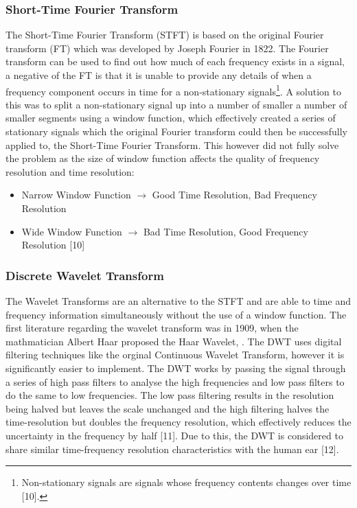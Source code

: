 \documentclass[a4paper, 11pt]{article}
\begin{document}
\subsubsection{Short-Time Fourier Transform}
The Short-Time Fourier Transform (STFT) is based on the original Fourier transform (FT) which was developed by Joseph Fourier in 1822. The Fourier transform can be used to find out how much of each frequency exists in a signal, a negative of the FT is that it is unable to provide any details of when a frequency component occurs in time for a non-stationary signals\footnote{Non-stationary signals are signals whose frequency contents changes over time [10].}. A solution to this was to split a non-stationary signal up into a number of smaller a number of smaller segments using a window function, which effectively created a series of stationary signals which the original Fourier transform could then be successfully applied to, the Short-Time Fourier Transform. This however did not fully solve the problem as the size of window function affects the quality of frequency resolution and time resolution:
\begin{itemize}
\item Narrow Window Function $\longrightarrow$  Good Time Resolution, Bad Frequency Resolution
\item Wide Window Function $\longrightarrow$  Bad Time Resolution, Good Frequency Resolution [10]
\end{itemize}

\subsubsection{Discrete Wavelet Transform}
The Wavelet Transforms are an alternative to the STFT and are able to time and frequency information simultaneously without the use of a window function. The first literature regarding the wavelet transform was in 1909, when the mathmatician Albert Haar proposed the Haar Wavelet,  . The DWT uses digital filtering techniques like the orginal Continuous Wavelet Transform, however it is significantly easier to implement. The DWT works by passing the signal through a series of high pass filters to analyse the high frequencies and low pass filters to do the same to low frequencies. The low pass filtering results in the resolution being halved but leaves the scale unchanged and the high filtering halves the time-resolution but doubles the frequency resolution, which effectively reduces the uncertainty in the frequency by half [11]. Due to this, the DWT is considered to share similar time-frequency resolution characteristics with the human ear [12].
\end{document}
